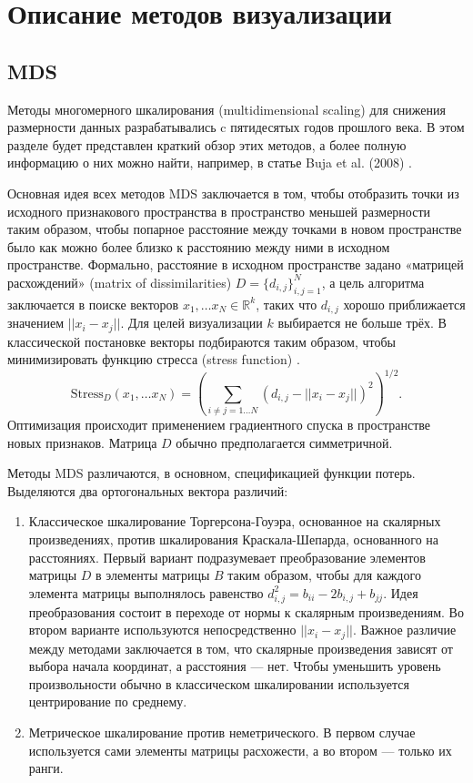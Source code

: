 \documentclass[10pt, a4paper]{extarticle}
\newcommand \R{\mathbb{R}}
\begin{document}
\section{Описание методов визуализации}

\subsection{MDS}

Методы многомерного шкалирования (multidimensional scaling) для снижения размерности данных разрабатывались c пятидесятых годов прошлого века. В этом разделе будет представлен краткий обзор этих методов, а более полную информацию о них можно найти, например, в статье Buja et al. (2008) \cite{buja2008data}.

Основная идея всех методов MDS заключается в том, чтобы отобразить точки из исходного признакового пространства в пространство меньшей размерности таким образом, чтобы попарное расстояние между точками в новом пространстве было как можно более близко к расстоянию между ними в исходном пространстве. Формально, расстояние в исходном пространстве задано «матрицей расхождений» (matrix of dissimilarities) $D = \{d_{i, j} \}_{i, j = 1}^{N}$, а цель алгоритма заключается в поиске векторов $x_1, \ldots x_N \in \R^k$, таких что $d_{i, j}$ хорошо приближается значением $||x_i - x_j||$. Для целей визуализации $k$ выбирается не больше трёх. В классической постановке векторы подбираются таким образом, чтобы минимизировать функцию стресса  (stress function) \cite{kruskal1964multidimensional}.
\[
\text{Stress}_D(x_1, \ldots x_N) = \left( \sum_{i \ne j = 1\ldots N} (d_{i, j} - ||x_i - x_j||)^2  \right)^{1/2}.
\]
Оптимизация происходит применением градиентного спуска в пространстве новых признаков. Матрица $D$ обычно предполагается симметричной. 

Методы MDS различаются, в основном, спецификацией функции потерь. Выделяются два ортогональных вектора различий:
\begin{enumerate}
	\item Классическое шкалирование Торгерсона-Гоуэра, основанное на скалярных произведениях, против шкалирования Краскала-Шепарда, основанного на расстояниях. 
	Первый вариант подразумевает преобразование элементов матрицы $D$ в элементы матрицы $B$ таким образом, чтобы для каждого элемента матрицы выполнялось равенство $d_{i, j}^2 = b_{ii} -2b_{i, j} + b_{jj}$. 
	Идея преобразования состоит в переходе от нормы к скалярным произведениям. 
	Во втором варианте используются непосредственно $||x_i - x_j||$. Важное различие между методами заключается в том, что скалярные произведения зависят от выбора начала координат, а расстояния — нет. Чтобы уменьшить уровень произвольности обычно в классическом шкалировании используется центрирование по среднему.
	\item Метрическое шкалирование против неметрического. 
	В первом случае используется сами элементы матрицы расхожести, а во втором — только их ранги. 
\end{enumerate}
\end{document}
